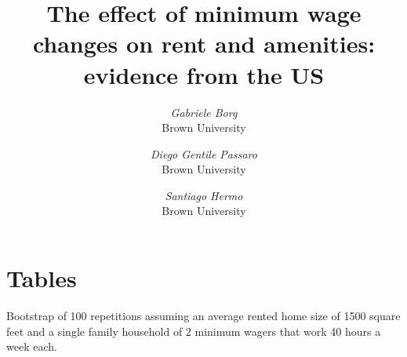 \documentclass{article}
\title{The effect of minimum wage changes on rent and amenities: evidence from the US}
\author{
	\textit{Gabriele Borg} \\
	\small Brown University 
	\and
	\textit{Diego Gentile Passaro} \\
	\small Brown University
	\and
	\textit{Santiago Hermo} \\
	\small Brown University
}
\begin{document}
\maketitle

\section*{Tables}

Bootstrap of 100 repetitions assuming an average rented home size of 1500 square feet and a single family household of 2 minimum wagers that work 40 hours a week each. 
\begin{table}[h!]
\centering

\end{table}
\end{document}
